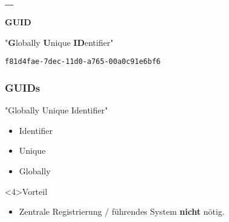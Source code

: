 \begin{frame}
    \frametitle{\_}    

    \begin{center}
        \vspace{1cm}
        \Huge{\textbf{GUID}}

        \Large{"\textbf{G}lobally \textbf{U}nique \textbf{ID}entifier"}

        \texttt{f81d4fae-7dec-11d0-a765-00a0c91e6bf6}
    \end{center}
\end{frame}


\begin{frame}
    \frametitle{GUIDs}    

    \vspace{-0.3cm}

    "Globally Unique Identifier"

    \vspace{0.2cm}

    \begin{itemize}
        \item<1-> Identifier
        \item<2-> Unique
        \item<3-> Globally
    \end{itemize}

    \vspace{-1.2cm}




    \vfill

    \begin{exampleblock}<4>{Vorteil}
        \begin{itemize}
            \item Zentrale Registrierung / führendes System \textbf{nicht} nötig.
        \end{itemize}
            
    \end{exampleblock}
\end{frame}
